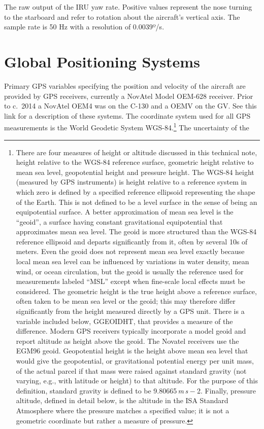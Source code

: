 \documentclass[
  english,
]{book}
\begin{document}
The raw output of the IRU yaw rate. Positive values represent the nose
turning to the starboard and refer to rotation about the aircraft's
vertical axis. The sample rate is 50 Hz with a resolution of
0.0039{º}/s.

\hypertarget{global-positioning-systems}{%
\section{Global Positioning Systems}\label{global-positioning-systems}}

Primary GPS variables specifying the position and velocity of the
aircraft are provided by GPS receivers, currently a NovAtel Model
OEM-628 receiver. Prior to c.~2014 a NovAtel OEM4 was on the C-130 and a
OEMV on the GV. See this link for a description of these systems. The
coordinate system used for all GPS measurements is the World Geodetic
System WGS-84.\footnote{There are four measures of height or altitude
  discussed in this technical note, height relative to the WGS-84
  reference surface, geometric height relative to mean sea level,
  geopotential height and pressure height. The WGS-84 height (measured
  by GPS instruments) is height relative to a reference system in which
  zero is defined by a specified reference ellipsoid representing the
  shape of the Earth. This is not defined to be a level surface in the
  sense of being an equipotential surface. A better approximation of
  mean sea level is the ``geoid'', a surface having constant
  gravitational equipotential that approximates mean sea level. The
  geoid is more structured than the WGS-84 reference ellipsoid and
  departs significantly from it, often by several 10s of meters. Even
  the geoid does not represent mean sea level exactly because local mean
  sea level can be influenced by variations in water density, mean wind,
  or ocean circulation, but the geoid is usually the reference used for
  measurements labeled ``MSL'' except when fine-scale local effects must
  be considered. The geometric height is the true height above a
  reference surface, often taken to be mean sea level or the geoid; this
  may therefore differ significantly from the height measured directly
  by a GPS unit. There is a variable included below, GGEOIDHT, that
  provides a measure of the difference. Modern GPS receivers typically
  incorporate a model geoid and report altitude as height above the
  geoid. The Novatel receivers use the EGM96 geoid. Geopotential height
  is the height above mean sea level that would give the geopotential,
  or gravitational potential energy per unit mass, of the actual parcel
  if that mass were raised against standard gravity (not varying, e.g.,
  with latitude or height) to that altitude. For the purpose of this
  definition, standard gravity is defined to be
  9.80665{ \emph{m} \emph{s} − 2}. Finally, pressure altitude, defined
  in detail below, is the altitude in the ISA Standard Atmosphere where
  the pressure matches a specified value; it is not a geometric
  coordinate but rather a measure of pressure.} The uncertainty of the
\end{document}
